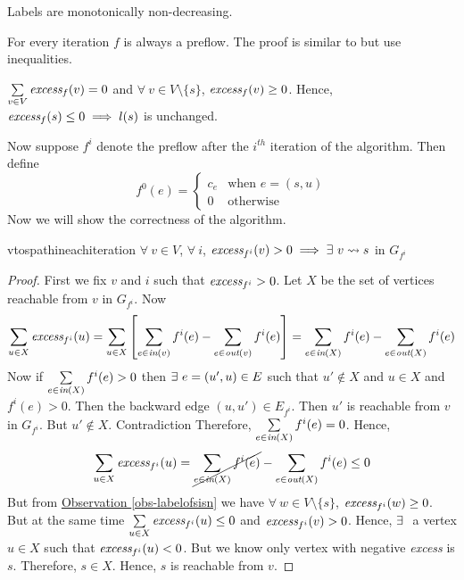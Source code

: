 \begin{observation}\label{obs-labelsmonotone}
	Labels are monotonically non-decreasing.
\end{observation}
\begin{observation}\label{obs-everyiterationpreflow}
	For every iteration $f$ is always a preflow. The proof is similar to  but use inequalities.
\end{observation}
\begin{observation}\label{obs-labelofsisn}
	$\sum\limits_{v\in V}\emph{excess}_f(v)=0$  and $\forall\ v\in V\setminus \{s\}$, $\emph{excess}_f(v)\geq 0$. Hence, $\emph{excess}_f(s)\leq 0\implies l(s)$ is unchanged.
\end{observation}

Now suppose $f^i$ denote the preflow after the $i^{th}$ iteration of the algorithm. Then define $$f^0(e)=\begin{cases}
		c_e & \text{when $e=(s,u)$} \\ 0 & \text{otherwise}
	\end{cases}$$
Now we will show the correctness of the algorithm.
\begin{lemma}{}{vtospathineachiteration}
	$\forall\ v\in V$, $\forall\ i$, $\emph{excess}_{f^i}(v)>0\implies\exs\ v\rightsquigarrow s$ in $G_{f^i}$
\end{lemma}
\begin{proof}
	First we fix $v$ and $i$ such that $\emph{excess}_{f^i}>0$. Let $X$ be the set of vertices reachable from $v$ in $G_{f^i}$. Now
	$$
		\sum_{u\in X}\emph{excess}_{f^i}(u) =\sum_{u\in X}\left[ \sum_{e\in \emph{in}(v)}f^i(e)-\sum_{e\in\emph{out}(v)}f^i(e) \right]= \sum_{e\in \emph{in}(X)}f^{i}(e)-\sum_{e\in\emph{out}{(X)}}f^{i}(e)$$
	Now if $\sum\limits_{e\in \emph{in}(X)}f^{i}(e)>0$ then $\exs\ e=(u',u)\in E$ such that $u'\notin X$ and $u\in X$ and $f^{i}(e)>0$. Then the backward edge $(u,u')\in E_{f^i}$. Then $u'$ is reachable from $v$ in $G_{f^i}$. But $u'\notin X$. Contradiction \ctr Therefore, $\sum\limits_{e\in \emph{in}(X)}  f^{i}(e)=0$. Hence, $$\sum_{u\in X}  \emph{excess}_{f^i}(u)= \cancel{\sum_{e\in \emph{in}(X)}f^{i}(e)}-\sum_{e\in\emph{out}{(X)}}f^{i}(e)\leq 0$$But from \hyperref[obs-labelofsisn]{Observation \ref{obs-labelofsisn}}  we have $\forall\ w\in V\setminus\{s\}$, $\emph{excess}_{f^i}(w)\geq 0$. But at the same time $\sum\limits_{u\in X}  \emph{excess}_{f^i}(u)\leq 0$ and $\emph{excess}_{f^i}(v)>0$. Hence, $\exists\ $ a vertex $u\in X$ such that $\emph{excess}_{f^i}(u)< 0$. But we know only vertex with negative \emph{excess} is $s$. Therefore, $s\in X$. Hence, $s$ is reachable from $v$.
\end{proof}
